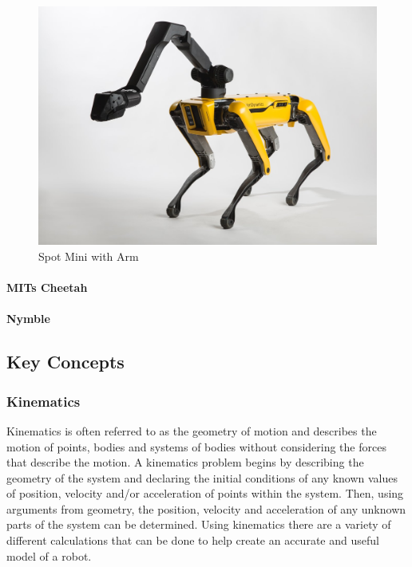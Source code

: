 \begin{figure}[H]
        \centering
        \includegraphics[width=120mm]{figures/SpotMiniwithArm.jpg}
        \caption{Spot Mini with Arm}
        \label{fig:my_label}
    \end{figure}

\paragraph{MITs Cheetah}

\paragraph{Nymble} %

\subsection{Key Concepts} %

\subsubsection{Kinematics}
 Kinematics is  often referred to as the geometry of motion and describes the motion of points, bodies and systems of bodies without considering the forces that describe the motion. A kinematics problem begins by describing the geometry of the system and declaring the initial conditions of any known values of position, velocity and/or acceleration of points within the system. Then, using arguments from geometry, the position, velocity and acceleration of any unknown parts of the system can be determined. Using kinematics there are a variety of different calculations that can be done to help create an accurate and useful model of a robot. 
